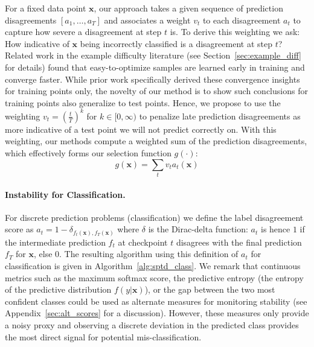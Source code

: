 For a fixed data point $\bm{x}$, our approach takes a given sequence of prediction disagreements $[a_1,\ldots,a_T]$ and associates a weight $v_t$ to each disagreement $a_t$ to capture how severe a disagreement at step $t$ is. To derive this weighting we ask: How indicative of $\bm{x}$ being incorrectly classified is a disagreement at step $t$? Related work in the example difficulty literature (see Section~\ref{sec:example_diff} for details) found that easy-to-optimize samples are learned early in training and converge faster. While prior work specifically derived these convergence insights for training points only, the novelty of our method is to show such conclusions for training points also generalize to test points. Hence, we propose to use the weighting $v_t = (\frac{t}{T})^k$ for $k \in [0,\infty)$ to penalize late prediction disagreements as more indicative of a test point we will not predict correctly on. With this weighting, our methods compute a weighted sum of the prediction disagreements, which effectively forms our selection function $g(\cdot)$: 
\begin{equation}
    \label{eq:score}
    g(\bm{x}) = \sum_{t} v_t a_t(\bm{x})    
\end{equation}

\paragraph{Instability for Classification.} For discrete prediction problems (\ie classification) we define the label disagreement score as $a_t = 1- \delta_{f_t(\bm{x}),f_T(\bm{x})}$ where $\delta$ is the Dirac-delta function: $a_t$ is hence $1$ if the intermediate prediction $f_t$ at checkpoint $t$ disagrees with the final prediction $f_T$ for $\bm{x}$, else $0$. The resulting algorithm using this definition of $a_t$ for classification is given in Algorithm~\ref{alg:sptd_class}. We remark that continuous metrics such as the maximum softmax score, the predictive entropy (\ie the entropy of the predictive distribution $f(y|\bm{x})$), or the gap between the two most confident classes could be used as alternate measures for monitoring stability (see Appendix~\ref{sec:alt_scores} for a discussion). However, these measures only provide a noisy proxy and observing a discrete deviation in the predicted class provides the most direct signal for potential mis-classification.

